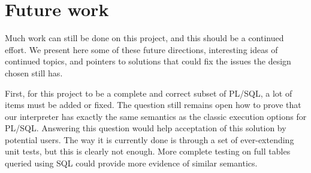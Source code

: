 \documentclass[twoside,11pt,a4paper]{article}
\newcommand{\startsection}[1]{
	\cleardoublepage
	\section{#1}
	\thispagestyle{basic}
}
\begin{document}
%

\startsection{Future work}
\label{sec:futurework}


Much work can still be done on this project, and this should be a continued effort. We present here some of these future directions, interesting ideas of continued topics, and pointers to solutions that could fix the issues the design chosen still has.

First, for this project to be a complete and correct subset of PL/SQL, a lot of items must be added or fixed. The question still remains open how to prove that our interpreter has exactly the same semantics as the classic execution options for PL/SQL. Answering this question would help acceptation of this solution by potential users. The way it is currently done is through a set of ever-extending unit tests, but this is clearly not enough. More complete testing on full tables queried using SQL could provide more evidence of similar semantics.
\end{document}
